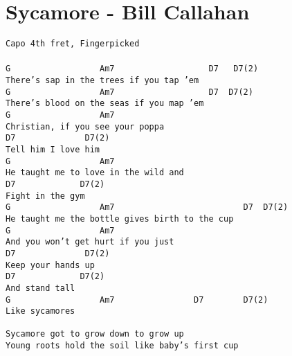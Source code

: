 \newpage
\section{Sycamore - Bill Callahan}
\label{Sycamore - Bill Callahan}
\texttt{Capo\ 4th\ fret,\ Fingerpicked\\
\\
G\ \ \ \ \ \ \ \ \ \ \ \ \ \ \ \ \ \ Am7\ \ \ \ \ \ \ \ \ \ \ \ \ \ \ \ \ \ \ D7\ \ \ D7(2)\\
There's\ sap\ in\ the\ trees\ if\ you\ tap\ 'em\\
G\ \ \ \ \ \ \ \ \ \ \ \ \ \ \ \ \ \ Am7\ \ \ \ \ \ \ \ \ \ \ \ \ \ \ \ \ \ \ D7\ \ D7(2)\\
There's\ blood\ on\ the\ seas\ if\ you\ map\ 'em\\
G\ \ \ \ \ \ \ \ \ \ \ \ \ \ \ \ \ \ Am7\ \ \ \ \ \ \ \ \ \ \ \ \\
Christian,\ if\ you\ see\ your\ poppa\\
D7\ \ \ \ \ \ \ \ \ \ \ \ \ \ D7(2)\ \ \ \\
Tell\ him\ I\ love\ him\\
G\ \ \ \ \ \ \ \ \ \ \ \ \ \ \ \ \ \ Am7\\
He\ taught\ me\ to\ love\ in\ the\ wild\ and\\
D7\ \ \ \ \ \ \ \ \ \ \ \ \ D7(2)\ \ \ \ \\
Fight\ in\ the\ gym\\
G\ \ \ \ \ \ \ \ \ \ \ \ \ \ \ \ \ \ Am7\ \ \ \ \ \ \ \ \ \ \ \ \ \ \ \ \ \ \ \ \ \ \ \ \ \ D7\ \ D7(2)\\
He\ taught\ me\ the\ bottle\ gives\ birth\ to\ the\ cup\\
G\ \ \ \ \ \ \ \ \ \ \ \ \ \ \ \ \ \ Am7\ \ \ \ \ \ \ \ \ \ \ \ \ \ \ \\
And\ you\ won't\ get\ hurt\ if\ you\ just\\
D7\ \ \ \ \ \ \ \ \ \ \ \ \ \ D7(2)\ \ \ \\
Keep\ your\ hands\ up\\
D7\ \ \ \ \ \ \ \ \ \ \ \ \ D7(2)\\
And\ stand\ tall\\
G\ \ \ \ \ \ \ \ \ \ \ \ \ \ \ \ \ \ Am7\ \ \ \ \ \ \ \ \ \ \ \ \ \ \ \ D7\ \ \ \ \ \ \ \ D7(2)\ \ \ \ \\
Like\ sycamores\\
\ \ \ \ \ \ \ \ \ \ \ \ \ \ \ \ \ \ \ \\
Sycamore\ got\ to\ grow\ down\ to\ grow\ up\\
Young\ roots\ hold\ the\ soil\ like\ baby's\ first\ cup\\
}
